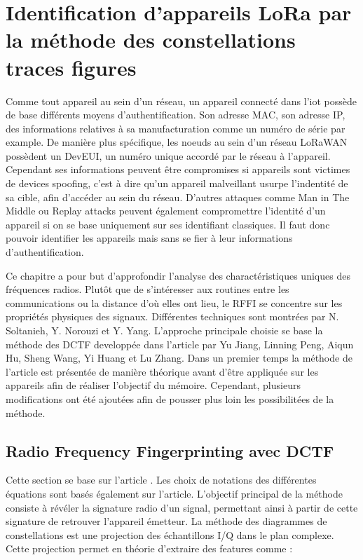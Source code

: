 \renewcommand{\leftmark}{IDENTIFICATION}

\chapter{Identification d'appareils LoRa par la méthode des constellations traces figures}

Comme tout appareil au sein d'un réseau, un appareil connecté dans l'iot possède de base différents moyens d'authentification. Son adresse \ac{MAC}, son adresse IP, des informations relatives à sa manufacturation comme un numéro de série par example. De manière plus spécifique, les noeuds au sein d'un réseau LoRaWAN possèdent un DevEUI, un numéro unique accordé par le réseau à l'appareil. Cependant ses informations peuvent être compromises si appareils sont victimes de devices spoofing, c'est à dire qu'un appareil malveillant usurpe l'indentité de sa cible, afin d'accéder au sein du réseau. D'autres attaques comme Man in The Middle ou Replay attacks peuvent également compromettre l'identité d'un appareil si on se base uniquement sur ses identifiant classiques\cite{attack}. Il faut donc pouvoir identifier les appareils mais sans se fier à leur informations d'authentification.

\vspace{0.1cm}

Ce chapitre a pour but d'approfondir l'analyse des charactéristiques uniques des fréquences radios. Plutôt que de s'intéresser aux routines entre les communications ou la distance d'où elles ont lieu, le \ac{RFFI} se concentre sur les propriétés physiques des signaux. Différentes techniques sont montrées par N. Soltanieh, Y. Norouzi et Y. Yang\cite{rffi1}. L'approche principale choisie se base la méthode des \ac{DCTF} developpée dans l'article \cite{loraDCTF} par Yu Jiang, Linning Peng, Aiqun Hu, Sheng Wang, Yi Huang et Lu Zhang. Dans un premier temps la méthode de l'article est présentée de manière théorique avant d'être appliquée sur les appareils afin de réaliser l'objectif du mémoire. Cependant, plusieurs modifications ont été ajoutées afin de pousser plus loin les possibilitées de la méthode.

\section{Radio Frequency Fingerprinting avec DCTF}\label{DCTF}

Cette section se base sur l'article \cite{loraDCTF}. Les choix de notations des différentes équations sont basés également sur l'article. L'objectif principal de la méthode consiste à révéler la signature radio d'un signal, permettant ainsi à partir de cette signature de retrouver l'appareil émetteur. La méthode des diagrammes de constellations est une projection des échantillons \ac{I/Q} dans le plan complexe. Cette projection permet en théorie d'extraire des features comme :

